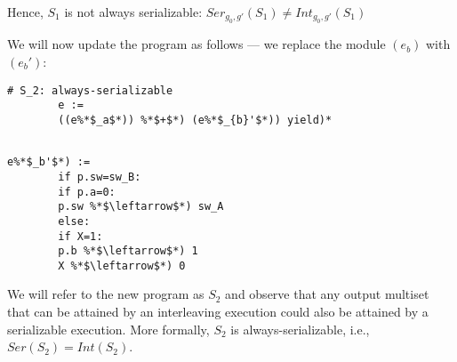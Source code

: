 	Hence, $S_1$ is not always serializable: $Ser_{g_0,g'}(S_1) \neq Int_{g_0,g'}(S_1)$
	
	
	We will now update the program as follows --- we replace the module $(e_b)$ 
	with $(e_b')$:
	
	\begin{lstlisting}[style=pythonStyle]
		# S_2: always-serializable
		e := 
		((e%*$_a$*)) %*$+$*) (e%*$_{b}'$*)) yield)*
		
	\end{lstlisting}
	
	
	
	\begin{lstlisting}[style=pythonStyle]
		e%*$_b'$*) := 	
		if p.sw=sw_B:
		if p.a=0:
		p.sw %*$\leftarrow$*) sw_A	
		else:
		if X=1:
		p.b %*$\leftarrow$*) 1
		X %*$\leftarrow$*) 0		
	\end{lstlisting}
	
	We will refer to the new program as $S_2$ and observe that any output multiset 
	that can be attained by an interleaving execution could also be attained by a 
	serializable execution. More formally, $S_2$ is always-serializable, i.e., 
	$Ser(S_2)=Int(S_2)$.
	

